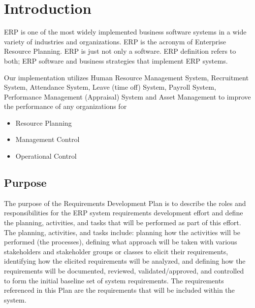 \chapter{Introduction}

ERP is one of the most widely implemented business software systems in a wide variety of industries and organizations. ERP is the acronym of Enterprise Resource Planning. ERP is just not only a software. ERP definition refers to both; ERP software and business strategies that implement ERP systems. 

Our implementation utilizes Human Resource Management System, Recruitment System, Attendance System, Leave (time off) System, Payroll System, Performance Management (Appraisal) System and Asset Management
to improve the performance of  any organizations for

\begin{itemize}
	\item Resource Planning
	\item Management Control 
	\item Operational Control
\end{itemize}


\section{Purpose}
The purpose of the Requirements Development Plan is to describe the roles and responsibilities for the ERP system requirements development effort and define the planning, activities, and tasks that will be performed as part of this effort.  The planning, activities, and tasks include: planning how the activities will be performed (the processes), defining what approach will be taken with various stakeholders and stakeholder groups or classes to elicit their requirements, identifying how the elicited requirements will be analyzed, and defining how the requirements will be documented, reviewed, validated/approved, and controlled to form the initial baseline set of system requirements.  The requirements referenced in this Plan are the requirements that will be included within the system.


